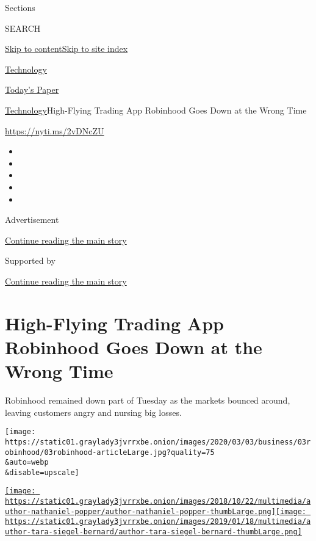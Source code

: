Sections

SEARCH

\protect\hyperlink{site-content}{Skip to
content}\protect\hyperlink{site-index}{Skip to site index}

\href{https://www.nytimes3xbfgragh.onion/section/technology}{Technology}

\href{https://myaccount.nytimes3xbfgragh.onion/auth/login?response_type=cookie\&client_id=vi}{}

\href{https://www.nytimes3xbfgragh.onion/section/todayspaper}{Today's
Paper}

\href{/section/technology}{Technology}\textbar{}High-Flying Trading App
Robinhood Goes Down at the Wrong Time

\url{https://nyti.ms/2vDNcZU}

\begin{itemize}
\item
\item
\item
\item
\item
\end{itemize}

Advertisement

\protect\hyperlink{after-top}{Continue reading the main story}

Supported by

\protect\hyperlink{after-sponsor}{Continue reading the main story}

\hypertarget{high-flying-trading-app-robinhood-goes-down-at-the-wrong-time}{%
\section{High-Flying Trading App Robinhood Goes Down at the Wrong
Time}\label{high-flying-trading-app-robinhood-goes-down-at-the-wrong-time}}

Robinhood remained down part of Tuesday as the markets bounced around,
leaving customers angry and nursing big losses.

\texttt{[image: https://static01.graylady3jvrrxbe.onion/images/2020/03/03/business/03robinhood/03robinhood-articleLarge.jpg?quality=75\\\&auto=webp\\\&disable=upscale]}

\href{https://www.nytimes3xbfgragh.onion/by/nathaniel-popper}{\texttt{[image: https://static01.graylady3jvrrxbe.onion/images/2018/10/22/multimedia/author-nathaniel-popper/author-nathaniel-popper-thumbLarge.png]}}\href{https://www.nytimes3xbfgragh.onion/by/tara-siegel-bernard}{\texttt{[image: https://static01.graylady3jvrrxbe.onion/images/2019/01/18/multimedia/author-tara-siegel-bernard/author-tara-siegel-bernard-thumbLarge.png]}}

